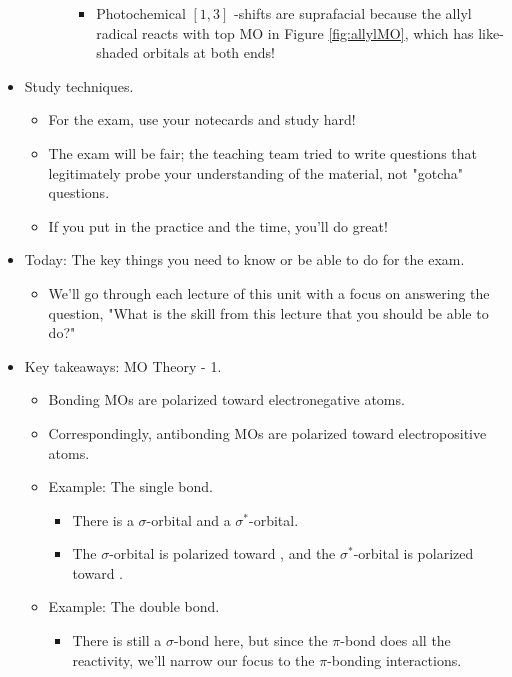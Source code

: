 \documentclass[../notes.tex]{subfiles}
\begin{document}
\begin{itemize}
\begin{itemize}
\begin{itemize}
            \begin{itemize}
                \item Photochemical $[1,3]$ -shifts are suprafacial because the allyl radical reacts with top MO in Figure \ref{fig:allylMO}, which has like-shaded orbitals at both ends!
            \end{itemize}
        \end{itemize}
    \end{itemize}
    \item Study techniques.
    \begin{itemize}
        \item For the exam, use your notecards and study hard!
        \item The exam will be fair; the teaching team tried to write questions that legitimately probe your understanding of the material, not "gotcha" questions.
        \item If you put in the practice and the time, you'll do great!
    \end{itemize}
    \item Today: The key things you need to know or be able to do for the exam.
    \begin{itemize}
        \item We'll go through each lecture of this unit with a focus on answering the question, "What is the skill from this lecture that you should be able to do?"
    \end{itemize}
    \item Key takeaways: MO Theory - 1.
    \begin{itemize}
        \item Bonding MOs are polarized toward electronegative atoms.
        \item Correspondingly, antibonding MOs are polarized toward electropositive atoms.
        \item Example: The  single bond.
        \begin{itemize}
            \item There is a $\sigma$-orbital and a $\sigma^*$-orbital.
            \item The $\sigma$-orbital is polarized toward , and the $\sigma^*$-orbital is polarized toward .
        \end{itemize}
        \item Example: The  double bond.
        \begin{itemize}
            \item There is still a $\sigma$-bond here, but since the $\pi$-bond does all the reactivity, we'll narrow our focus to the $\pi$-bonding interactions.

\end{itemize}
\end{itemize}
\end{itemize}
\end{document}
